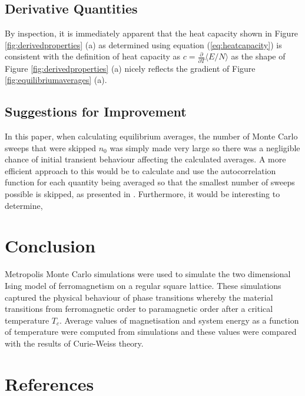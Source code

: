 \documentclass[11pt]{iopart}
\begin{document}
\subsection{Derivative Quantities}
By inspection, it is immediately apparent that the heat capacity shown in Figure \ref{fig:derivedproperties} (a) as determined using equation (\ref{eq:heatcapacity}) is consistent with the definition of heat capacity as $c = \frac{\partial}{\partial T}\langle E/N \rangle$ \cite{handout} as the shape of Figure \ref{fig:derivedproperties} (a) nicely reflects the gradient of Figure \ref{fig:equilibriumaverages} (a).
 
 \subsection{Suggestions for Improvement}
 In this paper, when calculating equilibrium averages, the number of Monte Carlo sweeps that were skipped $n_0$ was simply made very large so there was a negligible chance of initial transient behaviour affecting the calculated averages. A more efficient approach to this would be to calculate and use the autocorrelation function for each quantity being averaged so that the smallest number of sweeps possible is skipped, as presented in \cite{autocorrelation}. Furthermore, it would be interesting to determine, 
 
\section{Conclusion}
Metropolis Monte Carlo simulations were used to simulate the two dimensional Ising model of ferromagnetism on a regular square lattice. These simulations captured the physical behaviour of phase transitions whereby the material transitions from ferromagnetic order to paramagnetic order after a critical temperature $T_c$. Average values of magnetisation and system energy as a function of temperature were computed from simulations and these values were compared with the results of Curie-Weiss theory.

\section*{References}


\end{document}
